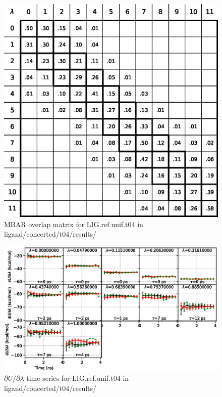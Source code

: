 \documentclass[journal=jctcce,manuscript=article,hyperref=false]{achemso}
\begin{document}
\begin{figure}
\includegraphics[clip,width=6in]{ligand.concerted.t04.results..S.eps}\vspace{-0.3cm}
\caption{MBAR overlap matrix for LIG.ref.unif.t04 in ligand/concerted/t04/results/}
\end{figure}


\begin{figure}
\includegraphics[clip,width=6in]{ligand.concerted.t04.results..DVDLvsT.eps}\vspace{-0.3cm}
\caption{$\partial U/\partial\lambda$ time series for LIG.ref.unif.t04 in ligand/concerted/t04/results/}
\end{figure}
\end{document}
